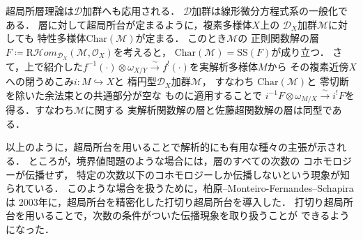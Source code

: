 ﻿\documentclass[a4paper]{jsarticle}
\theoremstyle{definition}
\newcommand{\mcal}{\mathcal}
\numberwithin{equation}{section}
\newcommand{\cD}{\mcal{D}}
\newcommand{\cM}{\mcal{M}}
\newcommand{\simar}{\mathrel{\overset{\sim}{\rightarrow}}}%
\theoremstyle{mystyle}
\begin{document}
\begin{gaiyo}
  超局所層理論は\(\mathcal{D}\)加群へも応用される．
  \(\mathcal{D}\)加群は線形微分方程式系の一般化である．
  層に対して超局所台が定まるように，複素多様体\(X\)上の
  \(\mathcal{D}_{X}\)加群\(\mathcal{M}\)に対しても
  特性多様体\(\mathrm{Char}(\mathcal{M})\)が定まる．
  このとき\(\mathcal{M}\)の
  正則関数解の層\(
    F\coloneqq 
    \mathrm{R}\mathcal{H}om_{\mathcal{D}_{X}}(\mathcal{M},\mathcal{O}_{X})
  \)を考えると，
  \(\mathrm{Char}(\mathcal{M})=\mathrm{SS}(F)\)が成り立つ．
  さて，上で紹介した\(
    f^{-1}(\cdot)\otimes \omega_{X/Y}
    \simar f^{!}(\cdot)
  \)を実解析多様体\(M\)から
  その複素近傍\(X\)への閉うめこみ\(i\colon M\hookrightarrow X\)と
  楕円型\(\cD_{X}\)加群\(\mathcal{M}\)，
  すなわち
  \(\mathrm{Char}(\mathcal{M})\)と
  零切断を除いた余法束との共通部分が空な
  ものに適用することで
  \(
    i^{-1}F\otimes \omega_{M/X}
    \overset{\sim}{\to}
    i^{!}F
  \)を得る．すなわち\(\cM\)に関する
  実解析関数解の層と佐藤超関数解の層は同型である．

  以上のように，超局所台を用いることで解析的にも有用な種々の主張が示される．
  ところが，境界値問題のような場合には，層のすべての次数の
  コホモロジーが伝播せず，
  特定の次数以下のコホモロジーしか伝播しないという現象が知られている．
  このような場合を扱うために，柏原--Monteiro-Fernandes--Schapira は
  2003年に，超局所台を精密化した打切り超局所台を導入した\cite{KFS03a}．
  打切り超局所台を用いることで，次数の条件がついた伝播現象を取り扱うことが
  できるようになった．


\end{gaiyo}
\end{document}
